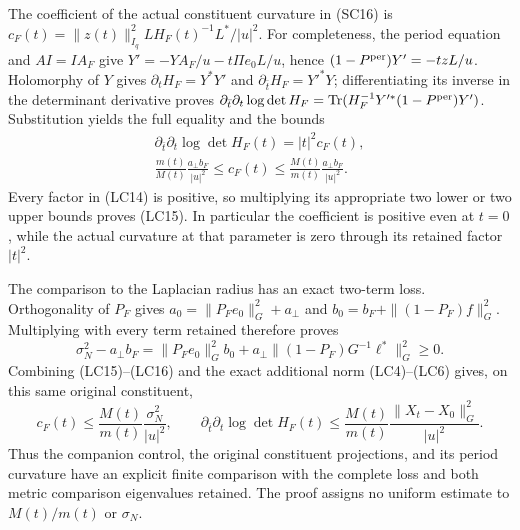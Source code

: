 The coefficient of the actual constituent curvature in (SC16) is
$c_F(t)=\|z(t)\|_{I_q}^2 L H_F(t)^{-1}L^*/|u|^2$.
For completeness, the period equation and $AI=IA_F$ give
$Y'=-YA_F/u-t\Pi e_0L/u$, hence
$(1-P^{\rm per})Y'=-tzL/u$.
Holomorphy of $Y$ gives $\partial_tH_F=Y^*Y'$ and
$\partial_{\bar t}H_F=Y'^*Y$; differentiating its inverse in
the determinant derivative proves
$\partial_{\bar t}\partial_t\log\det H_F
=\operatorname{Tr}(H_F^{-1}Y'^*(1-P^{\rm per})Y')$.
Substitution yields the full equality and the bounds
\[
\begin{gathered}
 \partial_{\bar t}\partial_t\log\det H_F(t)=|t|^2c_F(t),\\
 \boxed{\frac{m(t)}{M(t)}\frac{a_\perp b_F}{|u|^2}
       \le c_F(t)\le
       \frac{M(t)}{m(t)}\frac{a_\perp b_F}{|u|^2}.}
\end{gathered}\tag{LC15}
\]
Every factor in (LC14) is positive, so multiplying its appropriate
two lower or two upper bounds proves (LC15). In particular the
coefficient is positive even at $t=0$, while the actual curvature
at that parameter is zero through its retained factor $|t|^2$.

The comparison to the Laplacian radius has an exact two-term loss.
Orthogonality of $P_F$ gives
$a_0=\|P_Fe_0\|_G^2+a_\perp$ and
$b_0=b_F+\|(1-P_F)f\|_G^2$. Multiplying with every term
retained therefore proves
\[
 \boxed{\sigma_N^2-a_\perp b_F
  =\|P_Fe_0\|_G^2 b_0
      +a_\perp\|(1-P_F)G^{-1}\ell^*\|_G^2\ge0.}
 \tag{LC16}
\]
Combining (LC15)--(LC16) and the exact additional norm (LC4)--(LC6)
gives, on this same original constituent,
\[
 c_F(t)\le\frac{M(t)}{m(t)}\frac{\sigma_N^2}{|u|^2},\qquad
 \partial_{\bar t}\partial_t\log\det H_F(t)
 \le\frac{M(t)}{m(t)}
           \frac{\|X_t-X_0\|_G^2}{|u|^2}.
\]
Thus the companion control, the original constituent projections,
and its period curvature have an explicit finite comparison with
the complete loss and both metric comparison eigenvalues retained.
The proof assigns no uniform estimate to $M(t)/m(t)$ or $\sigma_N$.
